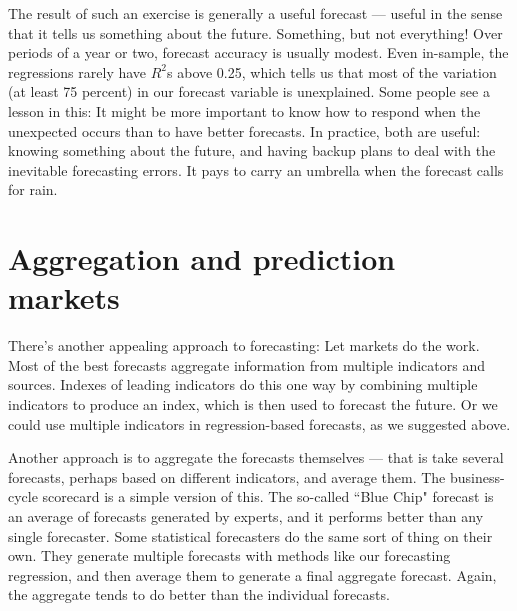 The result of such an exercise is generally a useful forecast --- useful in the sense that it tells us something about the future.
Something, but not everything!
Over periods of a year or two, forecast accuracy is usually modest.
Even in-sample, the regressions rarely have $R^2$s above 0.25,
which tells us that most of the variation (at least 75 percent) in our forecast variable is unexplained.
Some people see a lesson in this:  It might be more important
to know how to respond when the unexpected occurs
than to have better forecasts.
In practice, both are useful:  knowing something about the future,
and having backup plans to deal with the inevitable forecasting errors. It pays to carry an umbrella when the forecast calls for rain.


\section{Aggregation and prediction markets}

There's another appealing approach to forecasting: Let markets do the work.
Most of the best forecasts aggregate information from multiple
indicators and sources.
Indexes of leading indicators do this one way by combining multiple indicators to produce an index, which is then used
to forecast the future.
Or we could use multiple indicators in regression-based forecasts,
as we suggested above.

Another approach is to aggregate the forecasts themselves --- that is take several forecasts, perhaps based on different indicators, and average them.
The business-cycle scorecard is a simple version of this.
The so-called ``Blue Chip" forecast is an average of forecasts generated by experts, and it performs better than any single forecaster.
Some statistical forecasters do the same sort of thing on their own.
They generate multiple forecasts with methods like our forecasting regression, and then average them to generate a final aggregate forecast. Again,
the aggregate tends to do better than the individual forecasts.

